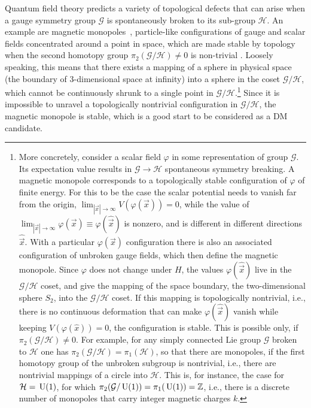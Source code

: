 Quantum field theory predicts a variety of topological defects that can arise
when a gauge symmetry group $\mathcal{G}$ is spontaneously broken to its sub-group $\mathcal{H}$. 
An example are magnetic monopoles~\cite{magnetic:monopoles}, particle-like configurations of gauge and scalar fields  concentrated around a point in space, which are made stable by topology when the second homotopy group
$\pi_2(\mathcal{G}/\mathcal{H})\neq 0$ is non-trivial \cite{topological:defects:books}.
Loosely speaking, this means that there exists a mapping of a sphere in physical space (the boundary of 3-dimensional space at infinity)
into a sphere in the coset $\mathcal{G}/\mathcal{H}$, which cannot be continuously shrunk to a single point in $\mathcal{G}/\mathcal{H}$.\footnote{More concretely, consider a scalar field  $\varphi$ in some representation of group $\mathcal{G}$. 
Its expectation value results in $\mathcal{G}\to \mathcal{H}$ spontaneous symmetry breaking. 
A magnetic monopole corresponds to a topologically stable configuration of $\varphi$ of finite energy. 
For this to be the case the scalar potential needs to vanish far from the origin, 
$\lim_{|\vec x|\to \infty}V(\varphi (\vec x))=0$, 
while the value of $\lim_{|\vec x|\to \infty} \varphi (\vec{x}) \equiv  \varphi (\hat{\vec{x}}) $ is nonzero, 
and is different in different directions $\hat{\vec{x}}$. 
With a particular $\varphi(\vec x)$ configuration there is also an associated configuration of unbroken gauge fields, 
which then define the magnetic monopole. 
Since $\varphi$ does not change under $H$, the values $\varphi(\hat{\vec{x}})$ live in the $\mathcal{G}/\mathcal{H}$ coset, 
and give the mapping of the space boundary,  the two-dimensional sphere $S_2$, into the $\mathcal{G}/\mathcal{H}$ coset. 
If this mapping is topologically nontrivial, i.e., there is no continuous deformation that can make $\varphi(\hat{\vec{x}})$ vanish while keeping $V(\varphi (\hat x))=0$, the configuration is stable. 
This is possible only, if $\pi_2(\mathcal{G}/\mathcal{H})\neq 0$. 
For example, for any simply connected Lie group $\mathcal{G}$ broken to $\mathcal{H}$ one has $\pi_2(\mathcal{G}/\mathcal{H})=\pi_1(\mathcal{H})$, so that there are monopoles, if the first homotopy group of the unbroken subgroup is nontrivial, i.e.,  there are nontrivial mappings of a circle into $\mathcal{H}$. 
This is, for instance, the case for $\mathcal{H}=\,{\rm U}(1)$, for which $\pi_2(\mathcal{G}/\,{\rm U}(1))=\pi_1(\,{\rm U}(1))=\mathbb{Z}$, 
i.e., there is a discrete number of monopoles that carry integer magnetic charges $k$.}
Since it is impossible to unravel a topologically nontrivial configuration  in $\mathcal{G}/\mathcal{H}$,  the magnetic monopole is stable, which is a good start to be considered as a DM candidate.


